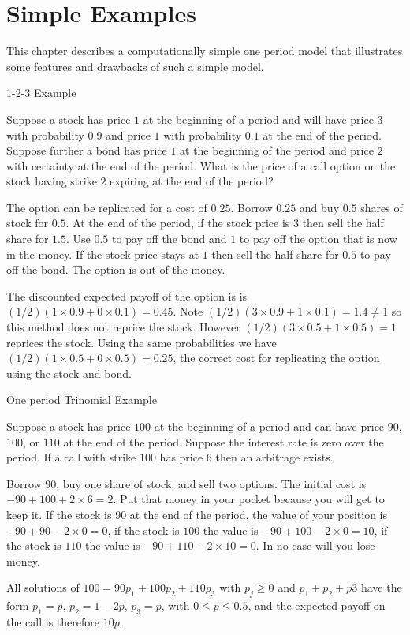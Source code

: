 \chapter{Simple Examples}

This chapter describes a computationally simple one period model
that illustrates some features and drawbacks of such a simple model.

\begin{section}{1-2-3 Example}

Suppose a stock has price $1$ at the beginning of a period and will have
price $3$ with probability $0.9$ and price $1$ with probability $0.1$
at the end of the period. Suppose further a bond has price $1$ at the
beginning of the period and price $2$ with certainty at the end of
the period. What is the price of a call option on the stock having
strike $2$ expiring at the end of the period?
\end{section}

The option can be replicated for a cost of $0.25$. Borrow $0.25$ and
buy $0.5$ shares of stock for $0.5$. At the end
of the period, if the stock price is $3$ then sell the half share
for $1.5$. Use $0.5$ to pay off the bond and $1$ to pay off the
option that is now in the money. If the stock price stays at $1$
then sell the half share for $0.5$ to pay off the bond. The option
is out of the money.

The discounted expected payoff of the option is
is $(1/2)(1\times 0.9 + 0\times 0.1) = 0.45$. 
Note $(1/2)(3\times 0.9 + 1\times 0.1) = 1.4 \not= 1$
so this method does not reprice the stock. However
$(1/2)(3\times 0.5 + 1\times 0.5) = 1$ reprices the
stock. Using the same probabilities we have
$(1/2)(1\times 0.5 + 0\times 0.5) = 0.25$, the correct cost
for replicating the option using the stock and bond.

\begin{section}{One period Trinomial Example}

Suppose a stock has price $100$ at the beginning of a period and
can have price $90$, $100$, or $110$ at the end of the period. Suppose
the interest rate is zero over the period. If a call with strike
$100$ has price $6$ then an arbitrage exists.

Borrow $90$, buy one share of stock, and sell two options. The initial
cost is $-90 + 100 + 2\times 6 = 2$. Put that money in your pocket
because you will get to keep it. If the stock is $90$ at the end
of the period, the value of your position is $-90 + 90 - 2\times 0 = 0$,
if the stock is $100$ the value is $-90 + 100 - 2\times 0 = 10$,
if the stock is $110$ the value is $-90 + 110 - 2\times 10 = 0$.
In no case will you lose money.

All solutions of $100 = 90p_1 + 100p_2 + 110p_3$ with $p_j \ge 0$
and $p_1 + p_2 + p3$ have the form $p_1 = p$, $p_2 = 1 - 2p$,
$p_3 = p$, with $0\le p \le 0.5$, and the expected payoff on
the call is therefore $10p$.

\end{section}

